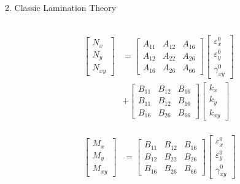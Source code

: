 \documentclass{beamer}
\begin{document}
\begin{frame}{2. Classic Lamination Theory}
\begin{columns}[c]
\begin{column}{0.5\textwidth}
	\begin{equation} \label{eq:force_and_moments}
		\begin{array}{l}
			\begin{aligned}
		\begin{bmatrix}
			N_x \\
			N_y \\
			N_{xy}
		\end{bmatrix}
		&=
		\begin{bmatrix}
			A_{11} & A_{12} & A_{16} \\
			A_{12} & A_{22} & A_{26} \\
			A_{16} & A_{26} & A_{66} 
		\end{bmatrix}
		\begin{bmatrix}
			\varepsilon_x^0 \\
			\varepsilon_y^0 \\
			\gamma_{xy}^0
		\end{bmatrix}   \\
		&+               
		\begin{bmatrix}
			B_{11} & B_{12} & B_{16} \\
			B_{11} & B_{12} & B_{16} \\
			B_{16} & B_{26} & B_{66} 
		\end{bmatrix}
		\begin{bmatrix}
			k_x \\
			k_y \\
			k_{xy} 
		\end{bmatrix}  \\
	\end{aligned} \\ \\
	\begin{aligned}
		\begin{bmatrix}
			M_x \\
			M_y \\
			M_{xy}
		\end{bmatrix}
		&=
		\begin{bmatrix}
			B_{11} & B_{12} & B_{16} \\
			B_{12} & B_{22} & B_{26} \\
			B_{16} & B_{26} & B_{66} 
		\end{bmatrix}
		\begin{bmatrix}
			\varepsilon_x^0 \\
			\varepsilon_y^0 \\
			\gamma_{xy}^0
		\end{bmatrix} \\ 

\end{aligned}
\end{array}
\end{equation}
\end{column}
\end{columns}
\end{frame}
\end{document}
